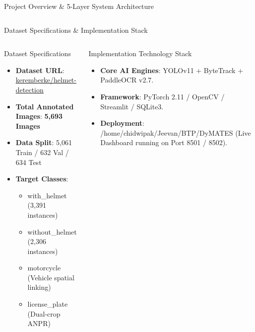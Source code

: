 \documentclass[10pt, compress, aspectratio=169]{beamer}
\begin{document}
\begin{frame}{Project Overview \& 5-Layer System Architecture}
\begin{columns}[T]
\begin{center}
        \end{center}
    \end{columns}
\end{frame}

\begin{frame}{Dataset Specifications \& Implementation Stack}
    \begin{columns}[c]
        \begin{block}{Dataset Specifications}
            \begin{itemize}\scriptsize
                \item \textbf{Dataset URL}: \href{https://huggingface.co/datasets/keremberke/helmet-detection}{\textcolor{BTPSecondary}{\underline{keremberke/helmet-detection}}}
                \item \textbf{Total Annotated Images}: \textbf{5,693 Images}
                \item \textbf{Data Split}: 5,061 Train / 632 Val / 634 Test
                \item \textbf{Target Classes}:
                \begin{itemize}\tiny
                    \item \textsf{with\_helmet} (3,391 instances)
                    \item \textsf{without\_helmet} (2,306 instances)
                    \item \textsf{motorcycle} (Vehicle spatial linking)
                    \item \textsf{license\_plate} (Dual-crop ANPR)
                \end{itemize}
            \end{itemize}
        \end{block}

        \begin{block}{Implementation Technology Stack}
            \begin{itemize}\small
                \item \textbf{Core AI Engines}: YOLOv11 + ByteTrack + PaddleOCR v2.7.
                \item \textbf{Framework}: PyTorch 2.11 / OpenCV / Streamlit / SQLite3.
                \item \textbf{Deployment}: \textsf{/home/chidwipak/Jeevan/BTP/DyMATES} (Live Dashboard running on Port 8501 / 8502).
            \end{itemize}
        \end{block}
    \end{columns}
\end{frame}
\end{document}
